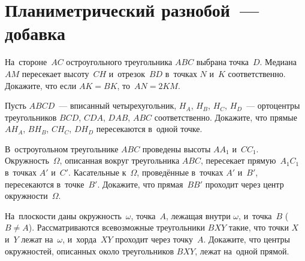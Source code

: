 
\section*{Планиметрический разнобой~--- добавка}





\begin{problems}

\item
На~стороне~$AC$ остроугольного треугольника $ABC$ выбрана точка~$D$.
Медиана~$AM$ пересекает высоту~$CH$ и~отрезок~$BD$ в~точках $N$ и~$K$
соответственно.
Докажите, что если $AK = BK$, то~$AN = 2 KM$.

\item
Пусть $ABCD$~--- вписанный четырехугольник, $H_A$, $H_B$, $H_C$, $H_D$~---
ортоцентры треугольников $BCD$, $CDA$, $DAB$, $ABC$ соответственно.
Докажите, что прямые $A H_A$, $B H_B$, $C H_C$, $D H_D$ пересекаются в~одной
точке.

\item
В~остроугольном треугольнике $ABC$ проведены высоты $A A_1$ и~$C C_1$.
Окружность~$\Omega$, описанная вокруг треугольника $ABC$, пересекает
прямую~$A_1 C_1$ в~точках $A'$ и~$C'$.
Касательные к~$\Omega$, проведённые в~точках $A'$ и~$B'$, пересекаются
в~точке~$B'$.
Докажите, что прямая~$B B'$ проходит через центр окружности~$\Omega$.

\item
На~плоскости даны окружность~$\omega$, точка~$A$, лежащая внутри $\omega$,
и~точка~$B$ ($B \neq A$).
Рассматриваются всевозможные треугольники $BXY$ такие, что точки $X$ и~$Y$
лежат на~$\omega$, и~хорда~$XY$ проходит через точку~$A$.
Докажите, что центры окружностей, описанных около треугольников $BXY$, лежат
на~одной прямой. 

\end{problems}

